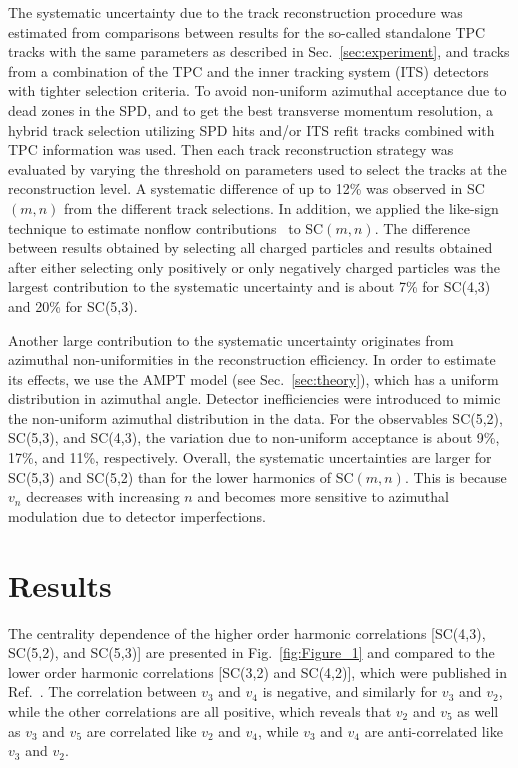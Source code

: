 The systematic uncertainty due to the track reconstruction procedure was estimated from comparisons between results for the so-called standalone TPC tracks with the 
same parameters as described in Sec.~\ref{sec:experiment}, and tracks from a combination of the TPC and the inner tracking system (ITS) detectors with tighter selection criteria.
To avoid non-uniform azimuthal acceptance due to dead zones in the SPD, and to get the best transverse momentum resolution, a hybrid track selection utilizing SPD hits and/or ITS refit tracks combined with TPC information was used.
Then each track reconstruction strategy was evaluated by varying the threshold on parameters used to select the tracks at the reconstruction level. 
A systematic difference of up to 12\% was observed in SC$(m,n)$ from the different track selections. 
In addition, we applied the like-sign technique to estimate nonflow contributions~\cite{Aamodt:2010pa} to SC$(m,n)$. The difference between results obtained by selecting all charged particles and results obtained after either selecting only positively or only negatively charged particles was the largest contribution to the systematic uncertainty and is about 7\% for SC(4,3) and 20\% for SC(5,3). 

Another large contribution to the systematic uncertainty originates from azimuthal non-uniformities in the reconstruction efficiency. In order to estimate its effects, we use the AMPT model (see Sec.~\ref{sec:theory}), which has a uniform distribution in azimuthal angle.
Detector inefficiencies were introduced to mimic the non-uniform azimuthal distribution in the data. For the observables SC(5,2), SC(5,3), and SC(4,3), the variation due to non-uniform acceptance is about 9\%, 17\%, and 11\%, respectively.
Overall, the systematic uncertainties are larger for SC(5,3) and SC(5,2) than for the lower harmonics of SC$(m,n)$.
This is because $v_{n}$ decreases with increasing $n$ and becomes more sensitive to azimuthal modulation due to detector imperfections. 

\section{Results}
\label{sec:results}
The centrality dependence of the higher order harmonic correlations [SC(4,3), SC(5,2), and SC(5,3)] are presented in Fig.~\ref{fig:Figure_1} and compared to the lower order harmonic correlations [SC(3,2) and SC(4,2)], which were published in Ref.~\cite{ALICE:2016kpq}. The correlation between $v_3$ and $v_4$ is negative, and similarly for $v_3$ and $v_2$, while the other correlations are all positive, which reveals that $v_2$ and $v_5$ as well as $v_3$ and $v_5$ are correlated like $v_2$ and $v_4$, while $v_3$ and $v_4$ are anti-correlated like $v_3$ and $v_2$.

